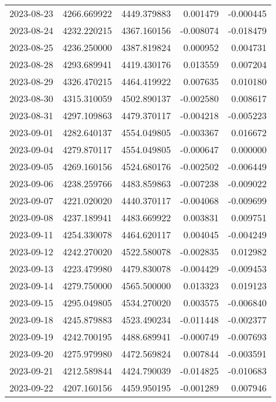 \begin{tabular}{lrrrr}
2023-08-23 & 4266.669922 & 4449.379883 &        0.001479 &    -0.000445 \\
2023-08-24 & 4232.220215 & 4367.160156 &       -0.008074 &    -0.018479 \\
2023-08-25 & 4236.250000 & 4387.819824 &        0.000952 &     0.004731 \\
2023-08-28 & 4293.689941 & 4419.430176 &        0.013559 &     0.007204 \\
2023-08-29 & 4326.470215 & 4464.419922 &        0.007635 &     0.010180 \\
2023-08-30 & 4315.310059 & 4502.890137 &       -0.002580 &     0.008617 \\
2023-08-31 & 4297.109863 & 4479.370117 &       -0.004218 &    -0.005223 \\
2023-09-01 & 4282.640137 & 4554.049805 &       -0.003367 &     0.016672 \\
2023-09-04 & 4279.870117 & 4554.049805 &       -0.000647 &     0.000000 \\
2023-09-05 & 4269.160156 & 4524.680176 &       -0.002502 &    -0.006449 \\
2023-09-06 & 4238.259766 & 4483.859863 &       -0.007238 &    -0.009022 \\
2023-09-07 & 4221.020020 & 4440.370117 &       -0.004068 &    -0.009699 \\
2023-09-08 & 4237.189941 & 4483.669922 &        0.003831 &     0.009751 \\
2023-09-11 & 4254.330078 & 4464.620117 &        0.004045 &    -0.004249 \\
2023-09-12 & 4242.270020 & 4522.580078 &       -0.002835 &     0.012982 \\
2023-09-13 & 4223.479980 & 4479.830078 &       -0.004429 &    -0.009453 \\
2023-09-14 & 4279.750000 & 4565.500000 &        0.013323 &     0.019123 \\
2023-09-15 & 4295.049805 & 4534.270020 &        0.003575 &    -0.006840 \\
2023-09-18 & 4245.879883 & 4523.490234 &       -0.011448 &    -0.002377 \\
2023-09-19 & 4242.700195 & 4488.689941 &       -0.000749 &    -0.007693 \\
2023-09-20 & 4275.979980 & 4472.569824 &        0.007844 &    -0.003591 \\
2023-09-21 & 4212.589844 & 4424.790039 &       -0.014825 &    -0.010683 \\
2023-09-22 & 4207.160156 & 4459.950195 &       -0.001289 &     0.007946 \\

\end{tabular}
